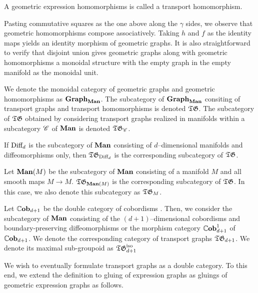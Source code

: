\documentclass[./Thick_TQFTs_and_Quantum_Information.tex]{subfiles}
\begin{document}
\begin{defn}
A geometric expression homomorphisms is called a transport homomorphism.
\end{defn}

Pasting commutative squares as the one above along the $\gamma$ sides, we
observe that geometric homomorphisms compose associatively. Taking
$h$ and $f$ as the identity maps yields an identity morphism of geometric
graphs. It is also straightforward to verify that disjoint union gives
geometric graphs along with geometric homomorphisms a monoidal structure with
the empty graph in the empty manifold as the monoidal unit.

\begin{defn}
We denote the monoidal category of geometric graphs and geometric
homomorphisms as $\textbf{Graph}_{\textbf{Man}}$. The subcategory of
$\textbf{Graph}_{\textbf{Man}}$ consiting of transport graphs and transport
homomorphisms is denoted $\mathfrak{TG}$. The subcategory of
$\mathfrak{TG}$ obtained by considering transport graphs realized in manifolds
within a subcategory $\mathscr{C}$ of $\textbf{Man}$ is denoted $\mathfrak{TG}_{\mathscr{C}}$.
\end{defn}

\begin{exm}
If $\text{Diff}_d$ is the subcategory of $\textbf{Man}$ consisting of $d$--dimensional
manifolds and diffeomorphisms only, then $\mathfrak{TG}_{\text{Diff}_d}$ is the corresponding
subcategory of $\mathfrak{TG}$.
\end{exm}

\begin{exm}
Let $\textbf{Man}(M)$ be the subcategory of $\textbf{Man}$ consisting of a manifold $M$ and all
smooth maps $M \to M$. $\mathfrak{TG}_{\textbf{Man}(M)}$ is the corresponding subcategory of
$\mathfrak{TG}$. In this case, we also denote this subcategory as $\mathfrak{TG}_M$.
\end{exm}

\begin{exm}
Let $\mathbb{C}\textbf{ob}_{d + 1}$ be the double category of cobordisms \cite{SymMonBicat}.
Then, we consider the subcategory of $\textbf{Man}$ consisting of the
$(d + 1)$--dimensional cobordisms and boundary-preserving diffeomorphisms or the
morphism category $\mathbb{C}\textbf{ob}_{d + 1}^1$ of $\mathbb{C}\textbf{ob}_{d + 1}$. We denote the
corresponding category of transport graphs $\mathfrak{TG}_{d + 1}$. We denote its maximal
sub-groupoid as $\mathfrak{TG}^{\text{iso}}_{d + 1}$
\end{exm}

We wish to eventually formulate transport graphs as a double category. To this
end, we extend the definition to gluing of expression graphs as gluings of
geometric expression graphs as follows.
\end{document}
